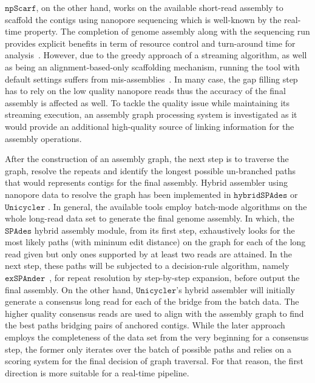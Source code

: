 \documentclass[10pt,twocolumn,twoside]{genpaper}
\newcommand{\npscarf}{$\mathtt{npScarf}$}
\newcommand{\unicycler}{$\mathtt{Unicycler}$}
\newcommand{\spades}{$\mathtt{SPAdes}$}
\begin{document}
\npscarf{}, on the other hand, works on the available short-read assembly to scaffold the contigs using nanopore sequencing which is well-known by the real-time property. The completion of genome assembly along with the sequencing run provides explicit benefits in term of resource control and turn-around time for analysis~\cite{Cao2017scaffolding}.  
However, due to the greedy approach of a streaming algorithm, as well as being an alignment-based-only scaffolding mechanism, running the tool with default settings suffers from mis-assemblies~\cite{Wick2017unicycler,Giordano2017}. In many case, the gap filling step has to rely on the low quality nanopore reads thus the accuracy of the final assembly is affected as well. 
To tackle the quality issue while maintaining its streaming execution, an assembly graph processing system is investigated as it would provide an additional high-quality source of linking information for the assembly operations. 

After the construction of an assembly graph, the next step is to traverse the graph, resolve the repeats and identify the longest possible un-branched paths that would represents contigs for the final assembly.
Hybrid assembler using nanopore data to resolve the graph has been implemented in $\mathtt{hybridSPAdes}$ \cite{AntipovKM2015} or \unicycler{} \cite{Wick2017unicycler}. 
In general, the available tools employ batch-mode algorithms on the whole long-read data set to generate the final genome assembly. 
In which, the \spades{} hybrid assembly module, from its first step, exhaustively looks for the most likely paths (with mininum edit distance) on the graph for each of the long read given but only ones supported by at least two reads are attained. In the next step, these paths will be subjected to a decision-rule algorithm, namely $\mathtt{exSPAnder}$~\cite{Prjibelski2014}, for repeat resolution by step-by-step expansion, before output the final assembly.
On the other hand, \unicycler{}'s hybrid assembler will initially generate a consensus long read for each of the bridge from the batch data. 
The higher quality consensus reads are used to align with the assembly graph to find the best paths bridging pairs of anchored contigs.
While the later approach employs the completeness of the data  set from the very beginning for a consensus step, the former only iterates over the batch of possible paths and relies on a scoring system for the final decision of graph traversal. For that reason, the first direction is more suitable for a real-time pipeline.
    
\end{document}
